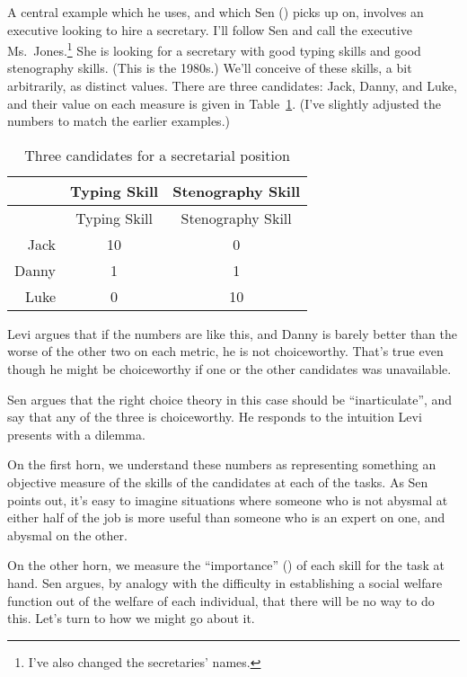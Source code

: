 \documentclass[
  11pt,
  letterpaper,
  DIV=11,
  numbers=noendperiod,
  twoside]{scrartcl}
\begin{document}
A central example which he uses, and which Sen
() picks up on, involves an executive
looking to hire a secretary. I'll follow Sen and call the executive
Ms.~Jones.\footnote{I've also changed the secretaries' names.} She is
looking for a secretary with good typing skills and good stenography
skills. (This is the 1980s.) We'll conceive of these skills, a bit
arbitrarily, as distinct values. There are three candidates: Jack,
Danny, and Luke, and their value on each measure is given in
Table~\ref{tbl-secretaries}. (I've slightly adjusted the numbers to
match the earlier examples.)

\begin{longtable}[]{@{}rcc@{}}
\caption{Three candidates for a secretarial
position}\label{tbl-secretaries}\tabularnewline
\toprule\noalign{}
& Typing Skill & Stenography Skill \\
\midrule\noalign{}
\endfirsthead
\toprule\noalign{}
& Typing Skill & Stenography Skill \\
\midrule\noalign{}
\endhead
\bottomrule\noalign{}
\endlastfoot
Jack & 10 & 0 \\
Danny & 1 & 1 \\
Luke & 0 & 10 \\
\end{longtable}

Levi argues that if the numbers are like this, and Danny is barely
better than the worse of the other two on each metric, he is not
choiceworthy. That's true even though he might be choiceworthy if one or
the other candidates was unavailable.

Sen argues that the right choice theory in this case should be
``inarticulate'', and say that any of the three is choiceworthy. He
responds to the intuition Levi presents with a dilemma.

On the first horn, we understand these numbers as representing something
an objective measure of the skills of the candidates at each of the
tasks. As Sen points out, it's easy to imagine situations where someone
who is not abysmal at either half of the job is more useful than someone
who is an expert on one, and abysmal on the other.

On the other horn, we measure the ``importance''
() of each skill for the task at
hand. Sen argues, by analogy with the difficulty in establishing a
social welfare function out of the welfare of each individual, that
there will be no way to do this. Let's turn to how we might go about it.
\end{document}
